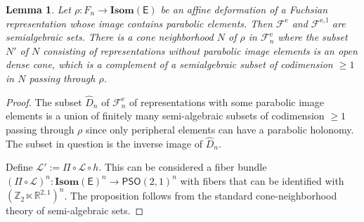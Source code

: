 \documentclass{amsart}
\numberwithin{equation}{section}
\newcommand\bR{{\mathbb{R}}}
\newcommand\bZ{{\mathbb Z}}
\newcommand\Hom{{\rm Hom}}
\newcommand\ra{\rightarrow}
\newcommand\Isom{{\mathbf{Isom}}}
\newcommand\SO{{\mathsf{SO}}}
\newcommand\Lspace{\mathsf E}
\newcommand\PO{{\mathsf{PSO}}}
\newtheorem{lemma}[theorem]{Lemma}
\theoremstyle{definition}
\theoremstyle{remark}
\newcommand{\rome}{\mathrm e}
\newcommand{\romel}{{\mathrm{e}, \mathrm{l}}}
\begin{document}
\begin{lemma} \label{lem:deformnop} 
Let $\rho:F_n \ra \Isom(\Lspace)$ be an affine deformation of a Fuchsian representation whose image contains parabolic elements.
Then $\mathcal{F}^{\rome}$ and $\mathcal{F}^{\romel}$ are semialgebraic sets. 
There is a cone neighborhood $N$ of $\rho$ in $\mathcal{F}^{\rome}_n$ where 
the subset $N'$ of $N$ consisting of representations without parabolic image elements is 
an open dense cone, which is a complement of a semialgebraic subset of codimension 
$\geq 1$ in $N$ passing through $\rho$. 
\end{lemma}
\begin{proof} 
The subset $\hat D_n$ of $\mathcal{F}^{\rome}_n$ of representations 
with some parabolic image elements is a union of finitely many semi-algebraic subsets of codimension $\geq 1$ passing through $\rho$
since only peripheral elements can have a parabolic holonomy. 
The subset in question is the inverse image of $\hat D_n$. 

Define $\mathcal{L'} := \Pi\circ \mathcal{L}\circ h$.
This can be considered a fiber bundle
$(\Pi\circ\mathcal{L})^n:\Isom(\Lspace)^n \ra \PO(2, 1)^n$
with fibers that can be identified with $(\bZ_2\ltimes \bR^{2, 1})^n$. 
The proposition follows from the standard 
cone-neighborhood theory of semi-algebraic sets. 
%
\end{proof} 
\end{document}
